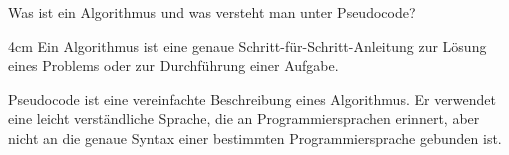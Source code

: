 \question[2]
Was ist ein Algorithmus und was versteht man unter Pseudocode?

\begin{solutionbox}{4cm}
Ein Algorithmus ist eine genaue Schritt-für-Schritt-Anleitung zur Lösung eines
Problems oder zur Durchführung einer Aufgabe.

Pseudocode ist eine vereinfachte Beschreibung eines Algorithmus.
Er verwendet eine leicht verständliche Sprache, die an Programmiersprachen erinnert, 
aber nicht an die genaue Syntax einer bestimmten Programmiersprache gebunden ist.
\end{solutionbox}